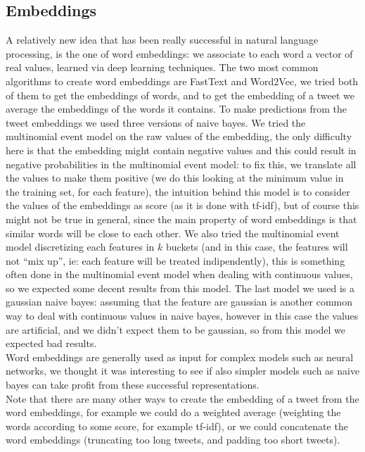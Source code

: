 \subsection*{Embeddings}
A relatively new idea that has been really successful in natural language processing, is the one of word embeddings: we associate to each word a vector of real values, learned via deep learning techniques. The two most common algorithms to create word embeddings are FastText and Word2Vec, we tried both of them to get the embeddings of words, and to get the embedding of a tweet we average the embeddings of the words it contains. To make predictions from the tweet embeddings we used three versions of naive bayes. We tried the multinomial event model on the raw values of the embedding, the only difficulty here is that the embedding might contain negative values and this could result in negative probabilities in the multinomial event model: to fix this, we translate all the values to make them positive (we do this looking at the minimum value in the training set, for each feature), the intuition behind this model is to consider the values of the embeddings as score (as it is done with tf-idf), but of course this might not be true in general, since the main property of word embeddings is that similar words will be close to each other. We also tried the multinomial event model discretizing each features in $k$ buckets (and in this case, the features will not ``mix up'', ie: each feature will be treated indipendently), this is something often done in the multinomial event model when dealing with continuous values, so we expected some decent results from this model. The last model we used is a gaussian naive bayes: assuming that the feature are gaussian is another common way to deal with continuous values in naive bayes, however in this case the values are artificial, and we didn't expect them to be gaussian, so from this model we expected bad results.\\
Word embeddings are generally used as input for complex models such as neural networks, we thought it was interesting to see if also simpler models such as naive bayes can take profit from these successful representations.\\
Note that there are many other ways to create the embedding of a tweet from the word embeddings, for example we could do a weighted average (weighting the words according to some score, for example tf-idf), or we could concatenate the word embeddings (truncating too long tweets, and padding too short tweets).

